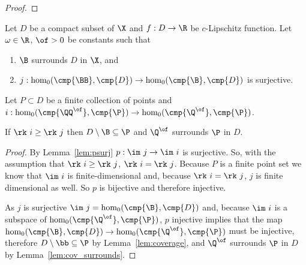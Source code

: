 \begin{proof}
\end{proof}

\begin{theorem}\label{thm:geo_tcc}
  Let $D$ be a compact subset of $\X$ and $f : D\to\R$ be $c$-Lipschitz function.
  Let $\omega\in\R$, $\of > 0$ be constants such that
  \begin{enumerate}[label=(\alph*)]
    \item $\B$ surrounds $D$ in $\X$, and
    \item $j : \hom_0(\cmp{\BB},\cmp{D})\to \hom_0(\cmp{\B}, \cmp{D})$ is surjective.
  \end{enumerate}
  Let $P\subset D$ be a finite collection of points and $i : \hom_0(\cmp{\QQ^\of}, \cmp{\P})\to \hom_0(\cmp{\Q^\of}, \cmp{\P})$.

  If $\rk~i\geq \rk~j$ then $D\setminus \B\subseteq \P$ and $\Q^\of$ surrounds $\P$ in $D$.
\end{theorem}
\begin{proof}
  By Lemma~\ref{lem:psurj} $p :\im~j\to \im~i$ is surjective.
  So, with the assumption that $\rk~i\geq \rk~j$, $\rk~i = \rk~j$.
  Because $P$ is a finite point set we know that $\im~i$ is finite-dimensional and, because $\rk~i = \rk~j$, $j$ is finite dimensional as well.
  So $p$ is bijective and therefore injective.

  As $j$ is surjective $\im~j = \hom_0(\cmp{\B}, \cmp{D})$ and, because $\im~i$ is a subspace of $\hom_0(\cmp{\Q^\of}, \cmp{\P})$, $p$ injective implies that the map $\hom_0(\cmp{\B}, \cmp{D})\to \hom_0(\cmp{\Q^\of}, \cmp{\P})$ must be injective, therefore $D\setminus\bb\subseteq \P$ by Lemma~\ref{lem:coverage}, and $\Q^\of$ surrounds $\P$ in $D$ by Lemma~\ref{lem:cov_surrounds}.
\end{proof}


